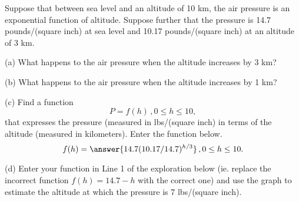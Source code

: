 \documentclass{ximera}
\begin{document}
\begin{question}   \label{Q88:ExponentialG}
Suppose that between sea level and an altitude of 10 km, the air pressure is an exponential function of altitude. Suppose further that the pressure is 14.7 pounds/(square inch) at sea level and 10.17 pounds/(square inch) at an altitude of 3 km.

(a) What happens to the air pressure when the altitude increases by 3 km?

(b) What happens to the air pressure when the altitude increases by 1 km?

(c) Find a function
\[
    P = f(h) \, , 0\leq h \leq 10,
\]
that expresses the pressure (measured in lbs/(square inch) in terms of the altitude (measured in kilometers). Enter the function below.
\[
      f(h) = \answer{14.7(10.17/14.7)^{h/3}} \, , 0\leq h \leq 10 .
\]

(d) Enter your function in Line 1 of the exploration below (ie. replace the incorrect function $f(h)=14.7-h$ with the correct one) and use the graph to estimate the altitude at which the pressure is 7 lbs/(square inch).


 
\begin{onlineOnly}
    \begin{center}
\end{center}
\end{onlineOnly}

\end{question}
\end{document}

